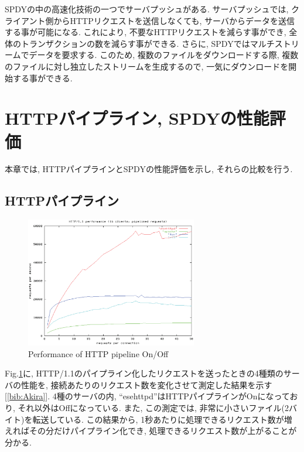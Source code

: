 \documentclass[twocolumn]{jsarticle}
\begin{document}
SPDYの中の高速化技術の一つでサーバプッシュがある.
サーバプッシュでは, クライアント側からHTTPリクエストを送信しなくても, サーバからデータを送信する事が可能になる.
これにより, 不要なHTTPリクエストを減らす事ができ, 全体のトランザクションの数を減らす事ができる.
さらに, SPDYではマルチストリームでデータを要求する.
このため, 複数のファイルをダウンロードする際, 複数のファイルに対し独立したストリームを生成するので,
一気にダウンロードを開始する事ができる.

\section{HTTPパイプライン, SPDYの性能評価}
本章では, HTTPパイプラインとSPDYの性能評価を示し, それらの比較を行う.
\subsection{HTTPパイプライン}
\begin{figure}[h]
  \centering
  \includegraphics[width=7.5cm]{eps/pipe_graph.eps}
  \caption{Performance of HTTP pipeline On/Off}
  \label{fig:pipe_g1}
\end{figure}
Fig.\ref{fig:pipe_g1}に, HTTP/1.1のパイプライン化したリクエストを送ったときの4種類のサーバの性能を,
接続あたりのリクエスト数を変化させて測定した結果を示す[\ref{bib:Akira}].
4種のサーバの内, ``esehttpd''はHTTPパイプラインがOnになっており, それ以外はOffになっている.
また, この測定では, 非常に小さいファイル(2バイト)を転送している.
この結果から, 1秒あたりに処理できるリクエスト数が増えればその分だけパイプライン化でき,
処理できるリクエスト数が上がることが分かる.
\end{document}
